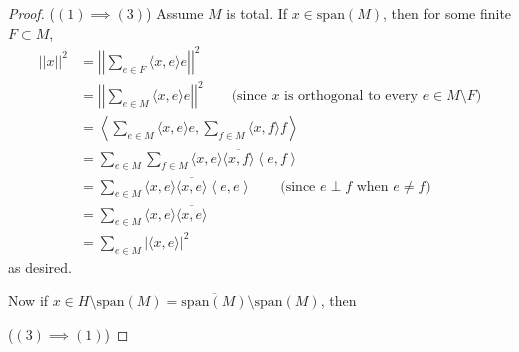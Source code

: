 \documentclass[12pt]{article}
\theoremstyle{definition}
\begin{document}
\begin{proof}
	($(1) \implies (3)$) Assume $M$ is total.
	If $x \in \mathrm{span}(M)$, then for some finite $F \subset M$, \begin{align*}
		||x||^2 & = \left|\left| \sum_{e \in F} \langle x, e \rangle e \right|\right|^2 \\
            & = \left|\left| \sum_{e \in M} \langle x, e \rangle e \right|\right|^2 \hspace{2em}\text{(since $x$ is orthogonal to every $e \in M \setminus F$)} \\
            & = \left\langle \sum_{e \in M} \langle x, e \rangle e, \sum_{f \in M} \langle x, f \rangle f \right\rangle \\
            & = \sum_{e \in M} \sum_{f \in M}\langle x, e \rangle \overline{\langle x, f \rangle}\left\langle  e,  f \right\rangle \\
            & = \sum_{e \in M} \langle x, e \rangle \overline{\langle x, e \rangle}\left\langle  e,  e \right\rangle \hspace{2em}\text{(since $e \perp f$ when $e \neq f$)} \\
            & = \sum_{e \in M} \langle x, e \rangle \overline{\langle x, e \rangle} \\
            & = \sum_{e \in M} |\langle x, e \rangle|^2
	\end{align*}
  as desired.

  Now if $x \in H \setminus \mathrm{span}(M) = \overline{\mathrm{span}(M)} \setminus \mathrm{span}(M)$, then

  ($(3) \implies (1)$) 
\end{proof}
\end{document}
